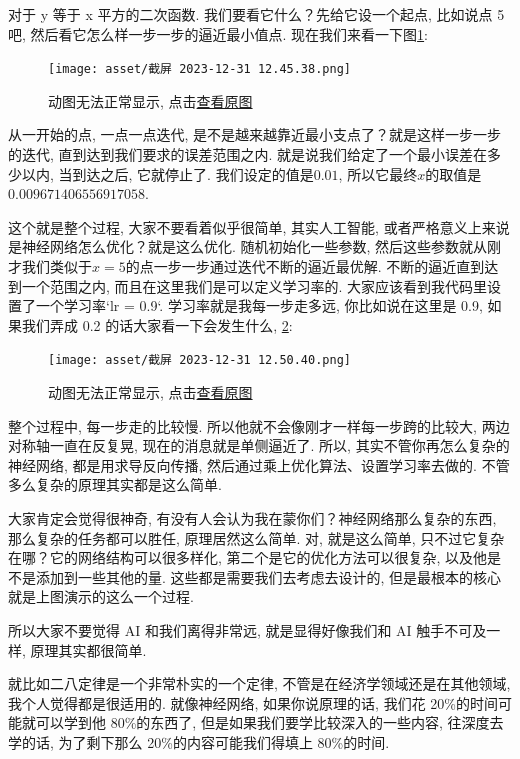 对于 y 等于 x 平方的二次函数. 我们要看它什么？先给它设一个起点, 比如说点 5 吧, 然后看它怎么样一步一步的逼近最小值点. 现在我们来看一下图\ref{fig:img10_3}: 

\begin{figure}[ht]
  \centering
  \texttt{[image: asset/截屏 2023-12-31 12.45.38.png]}
  \caption{动图无法正常显示, 点击\href{https://raw.githubusercontent.com/hivandu/notes/main/img/20230830160512.gif}{查看原图}}
  \label{fig:img10_3}
\end{figure}

从一开始的点, 一点一点迭代, 是不是越来越靠近最小支点了？就是这样一步一步的迭代, 直到达到我们要求的误差范围之内. 就是说我们给定了一个最小误差在多少以内, 当到达之后, 它就停止了. 我们设定的值是$0.01$, 所以它最终$x$的取值是 $0.009671406556917058$. 

这个就是整个过程, 大家不要看着似乎很简单, 其实人工智能, 或者严格意义上来说是神经网络怎么优化？就是这么优化. 随机初始化一些参数, 然后这些参数就从刚才我们类似于$x=5$的点一步一步通过迭代不断的逼近最优解. 不断的逼近直到达到一个范围之内, 而且在这里我们是可以定义学习率的. 大家应该看到我代码里设置了一个学习率`lr = 0.9`. 学习率就是我每一步走多远, 你比如说在这里是 0.9, 如果我们弄成 0.2 的话大家看一下会发生什么, \ref{fig:img10_4}: 

\begin{figure}[ht]
  \centering
  \texttt{[image: asset/截屏 2023-12-31 12.50.40.png]}
  \caption{动图无法正常显示, 点击\href{https://raw.githubusercontent.com/hivandu/notes/main/img/20230830160512.gif}{查看原图}}
  \label{fig:img10_4}
\end{figure}

整个过程中, 每一步走的比较慢. 所以他就不会像刚才一样每一步跨的比较大, 两边对称轴一直在反复晃, 现在的消息就是单侧逼近了. 所以, 其实不管你再怎么复杂的神经网络, 都是用求导反向传播, 然后通过乘上优化算法、设置学习率去做的. 不管多么复杂的原理其实都是这么简单. 

大家肯定会觉得很神奇, 有没有人会认为我在蒙你们？神经网络那么复杂的东西, 那么复杂的任务都可以胜任, 原理居然这么简单. 对, 就是这么简单, 只不过它复杂在哪？它的网络结构可以很多样化, 第二个是它的优化方法可以很复杂, 以及他是不是添加到一些其他的量. 这些都是需要我们去考虑去设计的, 但是最根本的核心就是上图演示的这么一个过程. 

所以大家不要觉得 AI 和我们离得非常远, 就是显得好像我们和 AI 触手不可及一样, 原理其实都很简单. 

就比如二八定律是一个非常朴实的一个定律, 不管是在经济学领域还是在其他领域, 我个人觉得都是很适用的. 就像神经网络, 如果你说原理的话, 我们花 20\%的时间可能就可以学到他 80\%的东西了, 但是如果我们要学比较深入的一些内容, 往深度去学的话, 为了剩下那么 20\%的内容可能我们得填上 80\%的时间. 

